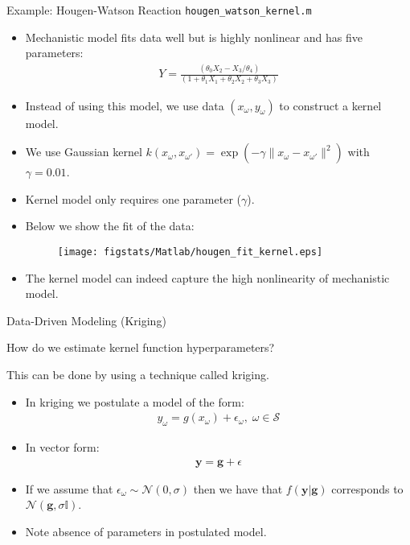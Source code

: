 \documentclass[9pt]{beamer}
\begin{document}
%
\begin{frame}{Example: Hougen-Watson Reaction \footnotesize{\texttt{hougen\_watson\_kernel.m}}}

\begin{itemize}
  \setlength{\itemsep}{5pt}
\item Mechanistic model fits data well but is highly nonlinear and has five parameters:
\begin{align*}
Y=\frac{(\theta_0X_2-X_3/\theta_4)}{(1+\theta_1X_1+\theta_2X_2+\theta_3X_3)}
\end{align*}
\item Instead of using this model, we use data $(x_\omega,y_\omega)$ to construct a kernel model. 
\item We use Gaussian kernel $k(x_\omega,x_{\omega'})=\exp(-\gamma\|x_\omega-x_{\omega'}\|^2)$ with $\gamma=0.01$. 
\item Kernel model only requires one parameter ($\gamma$). 
\item Below we show the fit of the data:


\begin{figure}[!htb]
    \centering
	\texttt{[image: figstats/Matlab/hougen\_fit\_kernel.eps]}
\end{figure}
\item The kernel model can indeed capture the high nonlinearity of mechanistic model.
\end{itemize}
\end{frame}


\begin{frame}{Data-Driven Modeling (Kriging)}

\begin{block}{}
How do we estimate kernel function hyperparameters?
\end{block}

This can be done by using a technique called kriging. 
\begin{itemize}
  \setlength{\itemsep}{10pt}
\item In kriging we postulate a model of the form:
\begin{align*}
{y}_\omega = g(x_\omega)+\epsilon_\omega,\; \omega \in \mathcal{S}
\end{align*}
\item In vector form:
\begin{align*}
\mathbf{y}= \mathbf{g}+\epsilon
\end{align*}
\item If we assume that $\epsilon_\omega \sim \mathcal{N}(0,\sigma)$ then we have that $f(\mathbf{y}|\mathbf{g})$ corresponds to $\mathcal{N}(\mathbf{g},\sigma \mathbb{I})$. 
\item Note absence of parameters in postulated model. 
\end{itemize}


\end{frame}
\end{document}
